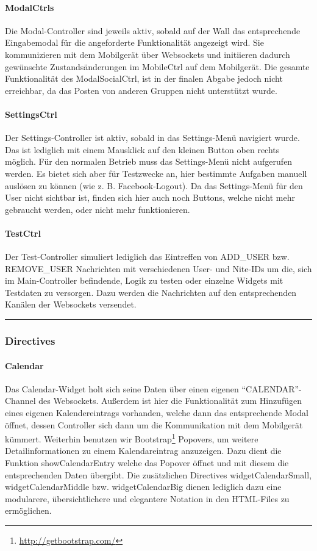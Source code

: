 \documentclass[10pt,a4paper]{report}
\newcommand{\code}[1]{{\fontfamily{cmvtt}\selectfont #1}}
\newcommand{\HRule}{\rule{\linewidth}{0.1pt}} %
\begin{document}
				\paragraph{ModalCtrls}
					Die Modal-Controller sind jeweils aktiv, sobald auf der Wall das entsprechende Eingabemodal für die angeforderte Funktionalität angezeigt wird. Sie kommunizieren mit dem Mobilgerät über Websockets und initiieren dadurch gewünschte Zustandsänderungen im MobileCtrl auf dem Mobilgerät. Die gesamte Funktionalität des ModalSocialCtrl, ist in der finalen Abgabe jedoch nicht erreichbar, da das Posten von anderen Gruppen nicht unterstützt wurde.
				\paragraph{SettingsCtrl}
					Der Settings-Controller ist aktiv, sobald in das Settings-Menü navigiert wurde. Das ist lediglich mit einem Mausklick auf den kleinen Button oben rechts möglich. Für den normalen Betrieb muss das Settings-Menü nicht aufgerufen werden. Es bietet sich aber für Testzwecke an, hier bestimmte Aufgaben manuell auslösen zu können (wie z. B. Facebook-Logout). Da das Settings-Menü für den User nicht sichtbar ist, finden sich hier auch noch Buttons, welche nicht mehr gebraucht werden, oder nicht mehr funktionieren.
				\paragraph{TestCtrl}
					Der Test-Controller simuliert lediglich das Eintreffen von \code{ADD\_USER} bzw. \code{REMOVE\_USER} Nachrichten mit verschiedenen User- und Nite-IDs um die, sich im Main-Controller befindende, Logik zu testen oder einzelne Widgets mit Testdaten zu versorgen. Dazu werden die Nachrichten auf den entsprechenden Kanälen der Websockets versendet.\\
				\HRule
			\subsubsection{Directives}
				\paragraph{Calendar}
					Das Calendar-Widget holt sich seine Daten über einen eigenen "`CALENDAR"'-Channel des Websockets. Außerdem ist hier die Funktionalität zum Hinzufügen eines eigenen Kalendereintrags vorhanden, welche dann das entsprechende Modal öffnet, dessen Controller sich dann um die Kommunikation mit dem Mobilgerät kümmert. Weiterhin benutzen wir Bootstrap\footnote{\href{http://getbootstrap.com/}{http://getbootstrap.com/}} Popovers, um weitere Detailinformationen zu einem Kalendareintrag anzuzeigen. Dazu dient die Funktion \code{showCalendarEntry} welche das Popover öffnet und mit diesem die entsprechenden Daten übergibt. Die zusätzlichen Directives \code{widgetCalendarSmall}, \code{widgetCalendarMiddle} bzw. \code{widgetCalendarBig} dienen lediglich dazu eine modularere, übersichtlichere und elegantere Notation in den HTML-Files zu ermöglichen.
\end{document}
